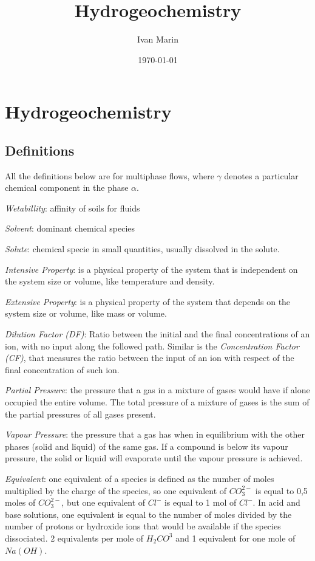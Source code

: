 \documentclass[11pt,twoside]{report}
\title{Hydrogeochemistry}
\author{Ivan Marin}
\date{\today}
\begin{document}
\maketitle
\tableofcontents




\chapter{Hydrogeochemistry}
\section{Definitions}
All the definitions below are for multiphase flows, where $\gamma$ denotes a particular chemical component in the phase $\alpha$.

\textit{Wetabillity}: affinity of soils for fluids

\textit{Solvent}: dominant chemical species

\textit{Solute}: chemical specie in small quantities, usually dissolved in the solute.

\textit{Intensive Property}: is a physical property of the system that is independent on the system size or volume, like temperature and density.

\textit{Extensive Property}: is a physical property of the system that depends on the system size or volume, like mass or volume. 

\textit{Dilution Factor (DF)}: Ratio between the initial and the final concentrations of an ion, with no input along the followed path. Similar is the \textit{Concentration Factor (CF)}, that measures the ratio between the input of an ion with respect of the final concentration of such ion. 

\textit{Partial Pressure}: the pressure that a gas in a mixture of gases would have if alone occupied the entire volume. The total pressure of a mixture of gases is the sum of the partial pressures of all gases present.

\textit{Vapour Pressure}: the pressure that a gas has when in equilibrium with the other phases (solid and liquid) of the same gas. If a compound is below its vapour pressure, the solid or liquid will evaporate until the vapour pressure is achieved.

\textit{Equivalent}: one equivalent of a species is defined as the number of moles multiplied by the charge of the species, so one equivalent of $CO_{3}^{2-}$ is equal to 0,5 moles of $CO_{3}^{2-}$, but one equivalent of $Cl^{-}$ is equal to 1 mol of $Cl^{-}$. In acid and base solutions, one equivalent is equal to the number of moles divided by the number of protons or hydroxide ions that would be available if the species dissociated. 2 equivalents per mole of $H_{2}CO^{3}$ and 1 equivalent for one mole of $Na(OH)$.
\end{document}

